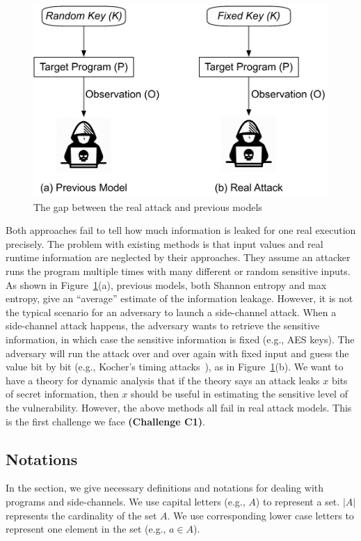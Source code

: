 \begin{figure}[h]
    \centering
    \includegraphics[width=.65\columnwidth]{./figures/RA.pdf}
\vspace*{-2pt}
    \caption{The gap between the real attack and previous models}\label{fig:gap}
\end{figure}

Both approaches fail to tell how much information is leaked for one real execution
precisely. The problem with existing methods is that input values and real runtime 
information are neglected by their approaches. 
They assume an attacker runs the program multiple times with many different or 
random sensitive inputs. As
shown in Figure~\ref{fig:gap}(a), previous models, both Shannon entropy and max
entropy, give an ``average'' estimate of the information leakage. However, it is
not the typical scenario for an adversary to launch a side-channel attack. When
a side-channel attack happens, the adversary wants to retrieve the sensitive
information, in which case the sensitive information is fixed (e.g., AES keys).
The adversary will run the attack over and over again with fixed input and 
guess the value bit by
bit (e.g., Kocher's timing attacks~\cite{kocher1996timing}), as in Figure~\ref{fig:gap}(b). 
We want to have a
theory for dynamic analysis that if the theory says an attack leaks $x$ bits of
secret information, then $x$ should be useful
in estimating the sensitive level of the vulnerability. However, the above
methods all fail in real attack models. This is the first challenge we face
\textbf{(Challenge C1)}.

\subsection{Notations}
In the section, we give necessary definitions and notations for dealing with
programs and side-channels. We use capital letters (e.g., $A$) to represent a
set. $|A|$ represents the cardinality of the set $A$. We use corresponding lower case
letters to represent one element in the set (e.g., $a \in A$).

